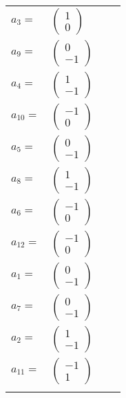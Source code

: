 \documentclass[1p]{elsarticle_modified}
\theoremstyle{definition}
\begin{document}
\begin{tabular}{m{7pt} m{180pt} m{7pt} m{180pt} }
\flushright $a_{3}=$&$\begin{pmatrix}1\\0\end{pmatrix}$ \\
\flushright $a_{9}=$&$\begin{pmatrix}0\\-1\end{pmatrix}$ \\
\flushright $a_{4}=$&$\begin{pmatrix}1\\-1\end{pmatrix}$ \\
\flushright $a_{10}=$&$\begin{pmatrix}-1\\0\end{pmatrix}$ \\
\flushright $a_{5}=$&$\begin{pmatrix}0\\-1\end{pmatrix}$ \\
\flushright $a_{8}=$&$\begin{pmatrix}1\\-1\end{pmatrix}$ \\
\flushright $a_{6}=$&$\begin{pmatrix}-1\\0\end{pmatrix}$ \\
\flushright $a_{12}=$&$\begin{pmatrix}-1\\0\end{pmatrix}$ \\
\flushright $a_{1}=$&$\begin{pmatrix}0\\-1\end{pmatrix}$ \\
\flushright $a_{7}=$&$\begin{pmatrix}0\\-1\end{pmatrix}$ \\
\flushright $a_{2}=$&$\begin{pmatrix}1\\-1\end{pmatrix}$ \\
\flushright $a_{11}=$&$\begin{pmatrix}-1\\1\end{pmatrix}$\\&\end{tabular}
\end{document}
